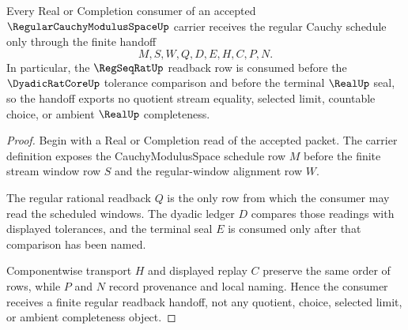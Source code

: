 \begin{theorem}
\label{thm:regular-cauchy-modulus-space-regseqrat-handoff}
Every Real or Completion consumer of an accepted
$\RegularCauchyModulusSpaceUp$ carrier receives the regular Cauchy schedule
only through the finite handoff
$$
M,S,W,Q,D,E,H,C,P,N .
$$
In particular, the $\RegSeqRatUp$ readback row is consumed before the
$\DyadicRatCoreUp$ tolerance comparison and before the terminal $\RealUp$ seal,
so the handoff exports no quotient stream equality, selected limit, countable
choice, or ambient $\RealUp$ completeness.
\end{theorem}
\begin{proof}
Begin with a Real or Completion read of the accepted packet. The carrier
definition exposes the CauchyModulusSpace schedule row $M$ before the finite
stream window row $S$ and the regular-window alignment row $W$.

The regular rational readback $Q$ is the only row from which the consumer may
read the scheduled windows. The dyadic ledger $D$ compares those readings with
displayed tolerances, and the terminal seal $E$ is consumed only after that
comparison has been named.

Componentwise transport $H$ and displayed replay $C$ preserve the same order of
rows, while $P$ and $N$ record provenance and local naming. Hence the consumer
receives a finite regular readback handoff, not any quotient, choice, selected
limit, or ambient completeness object.
\end{proof}


\begin{closurestatus}{\RegularCauchyModulusSpaceUp}
  \theoryclosure{\seedClosure}
  \formalstatus{\unformalizedV}
\end{closurestatus}
